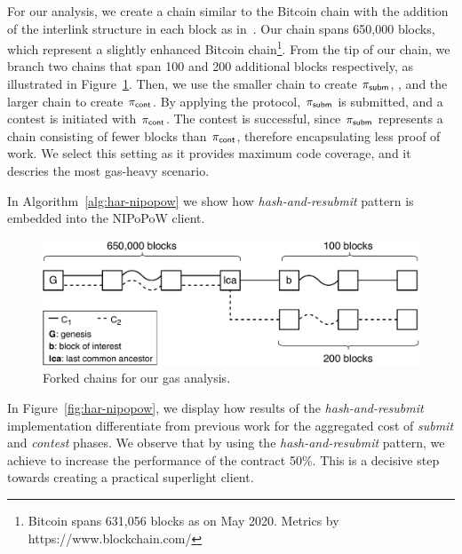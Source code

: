 For our analysis, we create a chain similar to the Bitcoin chain with the
addition of the interlink structure in each block as in~\cite{gglou}. Our chain
spans 650,000 blocks, which represent a slightly enhanced Bitcoin
chain\footnote{Bitcoin spans 631,056 blocks as on May 2020. Metrics by
https://www.blockchain.com/}. From the tip of our chain, we branch two chains
that span 100 and 200 additional blocks respectively, as illustrated in
Figure~\ref{fig:chains}. Then, we use the smaller chain to create  $\mathsf{\pi_{subm}}$, ,
and the larger chain to create $\mathsf{\pi_{cont}}$. By applying the protocol, $\mathsf{\pi_{subm}}$ is
submitted, and a contest is initiated with $\mathsf{\pi_{cont}}$. The contest is successful,
since $\mathsf{\pi_{subm}}$ represents a chain consisting of fewer blocks than $\mathsf{\pi_{cont}}$,
therefore encapsulating less proof of work. We select this setting as it
provides maximum code coverage, and it descries the most gas-heavy scenario.

In Algorithm~\ref{alg:har-nipopow} we show how \emph{hash-and-resubmit} pattern
is embedded into the NIPoPoW client.

\begin{figure}[!h]
    \begin{center}
        \includegraphics[width=1\columnwidth]{figures/nipopow-subm-cont}
    \end{center}
    \caption{Forked chains for our gas analysis.}
    \label{fig:chains}
\end{figure}

In Figure~\ref{fig:har-nipopow}, we display how results of the
\emph{hash-and-resubmit} implementation differentiate from previous work for
the aggregated cost of \emph{submit} and \emph{contest} phases.  We observe
that by using the \emph{hash-and-resubmit} pattern, we achieve to increase the
performance of the contract 50\%. This is a decisive step towards creating a
practical superlight client.



